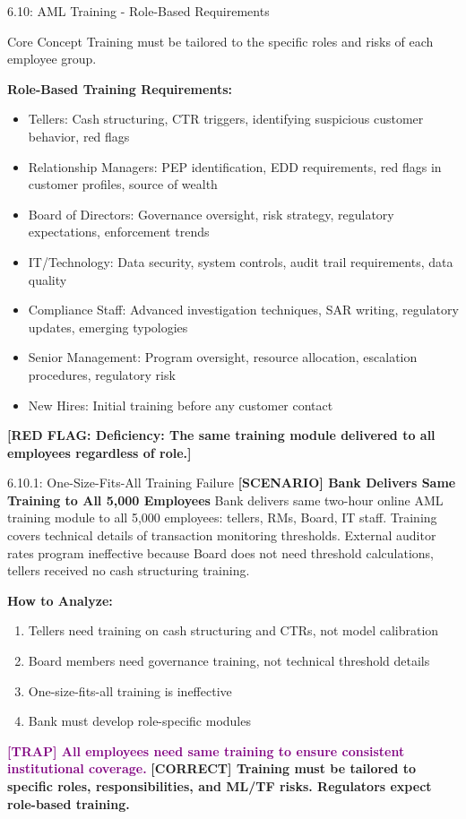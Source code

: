 \documentclass[11pt,a4paper]{beamer}
\newcommand{\trap}[1]{\textcolor{purple}{\textbf{[TRAP] #1}}}
\newcommand{\correct}[1]{\textcolor{green!50!black}{\textbf{[CORRECT] #1}}}
\newcommand{\scenario}[1]{\textcolor{blue!70!black}{\textbf{[SCENARIO] #1}}}
\newcommand{\redflag}[1]{\textcolor{red!80!black}{\textbf{[RED FLAG: #1]}}}
\begin{document}
\begin{frame}{6.10: AML Training - Role-Based Requirements}
	\begin{block}{Core Concept}
		Training must be tailored to the specific roles and risks of each employee group.
	\end{block}
	\textbf{Role-Based Training Requirements:}
	\begin{itemize}
		\item Tellers: Cash structuring, CTR triggers, identifying suspicious customer behavior, red flags
		\item Relationship Managers: PEP identification, EDD requirements, red flags in customer profiles, source of wealth
		\item Board of Directors: Governance oversight, risk strategy, regulatory expectations, enforcement trends
		\item IT/Technology: Data security, system controls, audit trail requirements, data quality
		\item Compliance Staff: Advanced investigation techniques, SAR writing, regulatory updates, emerging typologies
		\item Senior Management: Program oversight, resource allocation, escalation procedures, regulatory risk
		\item New Hires: Initial training before any customer contact
	\end{itemize}
	\redflag{Deficiency: The same training module delivered to all employees regardless of role.}
\end{frame}

\begin{frame}{6.10.1: One-Size-Fits-All Training Failure}
	\scenario{Bank Delivers Same Training to All 5,000 Employees}
	Bank delivers same two-hour online AML training module to all 5,000 employees: tellers, RMs, Board, IT staff. Training covers technical details of transaction monitoring thresholds. External auditor rates program ineffective because Board does not need threshold calculations, tellers received no cash structuring training.
	
	\vspace{0.1cm}
	\textbf{How to Analyze:}
	\begin{enumerate}
		\item Tellers need training on cash structuring and CTRs, not model calibration
		\item Board members need governance training, not technical threshold details
		\item One-size-fits-all training is ineffective
		\item Bank must develop role-specific modules
	\end{enumerate}
	\trap{All employees need same training to ensure consistent institutional coverage.}
	\correct{Training must be tailored to specific roles, responsibilities, and ML/TF risks. Regulators expect role-based training.}
\end{frame}
\end{document}
